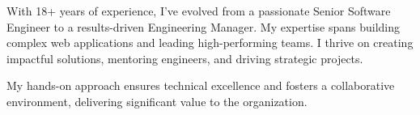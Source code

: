 
\begin{cvparagraph}

With 18+ years of experience, I've evolved from a passionate Senior Software Engineer to a results-driven Engineering Manager. My expertise spans building complex web applications and leading high-performing teams. I thrive on creating impactful solutions, mentoring engineers, and driving strategic projects.

My hands-on approach ensures technical excellence and fosters a collaborative environment, delivering significant value to the organization.

\end{cvparagraph}
